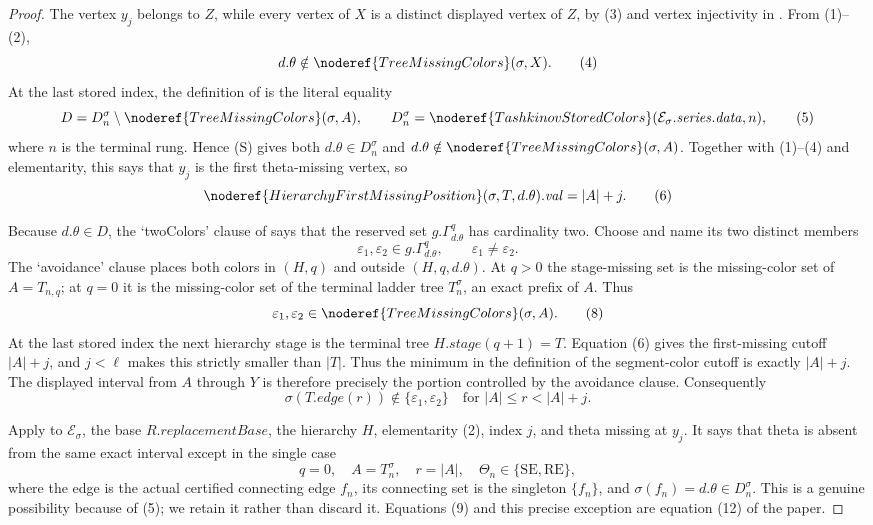 \begin{proof}
The vertex $y_j$ belongs to $Z$, while every vertex of $X$ is a distinct
displayed vertex of $Z$, by (3) and vertex injectivity in
.  From (1)--(2),
\[
 d.\theta\notin\noderef{TreeMissingColors}(\sigma,X).          \tag{4}
\]
At the last stored index, the definition of
 is the literal equality
\[
 D=D_n^\sigma\setminus\noderef{TreeMissingColors}(\sigma,A),
 \qquad
 D_n^\sigma=\noderef{TashkinovStoredColors}
    (\mathcal E_\sigma.\mathit{series.data},n),                \tag{5}
\]
where $n$ is the terminal rung.  Hence (S) gives both
$d.\theta\in D_n^\sigma$ and
$d.\theta\notin\noderef{TreeMissingColors}(\sigma,A)$.
Together with (1)--(4) and elementarity, this says that $y_j$ is the
first theta-missing vertex, so
\[
 \noderef{HierarchyFirstMissingPosition}(\sigma,T,d.\theta).
       \mathit{val}=|A|+j.                                    \tag{6}
\]

Because $d.\theta\in D$, the `twoColors' clause of
 says that the reserved set
$g.\Gamma^q_{d.\theta}$ has cardinality two.  Choose and name its two
distinct members
\[
 \varepsilon _1,\varepsilon _2\in g.\Gamma^q_{d.\theta},
 \qquad \varepsilon _1\ne\varepsilon _2.                    \tag{7}
\]
The `avoidance' clause places both colors in
$(H,q)$ and outside
$(H,q,d.\theta)$.  At $q>0$ the
stage-missing set is the missing-color set of $A=T_{n,q}$; at $q=0$ it
is the missing-color set of the terminal ladder tree $T_n^\sigma$, an
exact prefix of $A$.  Thus
\[
 \varepsilon _1,\varepsilon _2
       \in\noderef{TreeMissingColors}(\sigma,A).               \tag{8}
\]
At the last stored index the next hierarchy stage is the terminal tree
$H.\mathit{stage}(q+1)=T$.  Equation (6) gives the first-missing cutoff
$|A|+j$, and $j<\ell$ makes this strictly smaller than $|T|$.  Thus the
minimum in the definition of the segment-color cutoff is exactly
$|A|+j$.  The displayed interval from $A$ through $Y$ is therefore
precisely the portion controlled by the avoidance clause.  Consequently
\[
 \sigma(T.\mathit{edge}(r))\notin
       \{\varepsilon _1,\varepsilon _2\}
       \quad\text{for }|A|\le r<|A|+j.                        \tag{9}
\]

Apply  to
$\mathcal E_\sigma$, the base $R.\mathit{replacementBase}$, the
hierarchy $H$, elementarity (2), index $j$, and theta missing at $y_j$.
It says that theta is absent from the same exact interval except in the
single case
\[
 q=0,\quad A=T_n^\sigma,\quad r=|A|,\quad
 \Theta_n\in\{\mathrm{SE},\mathrm{RE}\},
\]
where the edge is the actual certified connecting edge $f_n$, its
connecting set is the singleton $\{f_n\}$, and
$\sigma(f_n)=d.\theta\in D_n^\sigma$.  This is a genuine possibility
because of (5); we retain it rather than discard it.  Equations (9) and
this precise exception are equation (12) of the paper.


\end{proof}
